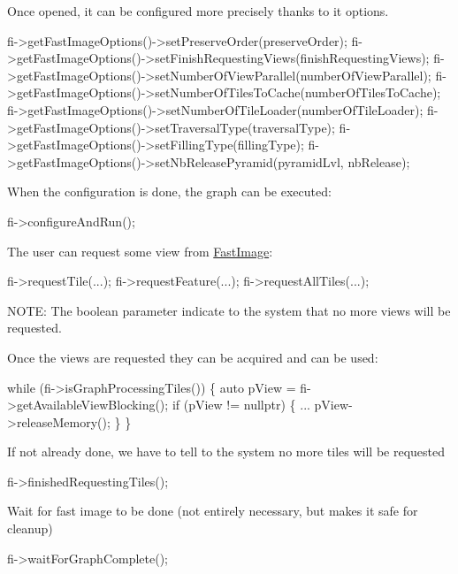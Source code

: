Once opened, it can be configured more precisely thanks to it options.


\begin{DoxyCode}
fi->getFastImageOptions()->setPreserveOrder(preserveOrder);
fi->getFastImageOptions()->setFinishRequestingViews(finishRequestingViews);
fi->getFastImageOptions()->setNumberOfViewParallel(numberOfViewParallel);
fi->getFastImageOptions()->setNumberOfTilesToCache(numberOfTilesToCache);
fi->getFastImageOptions()->setNumberOfTileLoader(numberOfTileLoader);
fi->getFastImageOptions()->setTraversalType(traversalType);
fi->getFastImageOptions()->setFillingType(fillingType);
fi->getFastImageOptions()->setNbReleasePyramid(pyramidLvl, nbRelease);
\end{DoxyCode}


When the configuration is done, the graph can be executed\+:


\begin{DoxyCode}
fi->configureAndRun();
\end{DoxyCode}


The user can request some view from \hyperlink{classfi_1_1FastImage}{Fast\+Image}\+:


\begin{DoxyCode}
fi->requestTile(...);
fi->requestFeature(...);
fi->requestAllTiles(...);
\end{DoxyCode}


N\+O\+TE\+: The boolean parameter indicate to the system that no more views will be requested.

Once the views are requested they can be acquired and can be used\+:


\begin{DoxyCode}
\textcolor{keywordflow}{while} (fi->isGraphProcessingTiles()) \{
  \textcolor{keyword}{auto} pView = fi->getAvailableViewBlocking();
  \textcolor{keywordflow}{if} (pView != \textcolor{keyword}{nullptr}) \{
  ...
  pView->releaseMemory();
  \}
\}
\end{DoxyCode}


If not already done, we have to tell to the system no more tiles will be requested


\begin{DoxyCode}
fi->finishedRequestingTiles();
\end{DoxyCode}


Wait for fast image to be done (not entirely necessary, but makes it safe for cleanup) 
\begin{DoxyCode}
fi->waitForGraphComplete();
\end{DoxyCode}



